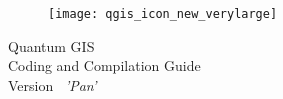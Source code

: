 
\begin{titlepage}
\begin{center}

\begin{figure}[H]
\begin{center}
\texttt{[image: qgis\_icon\_new\_verylarge]} 
\end{center}
\end{figure}

\Huge{Quantum GIS}\\
\vspace{0.5cm}
\Large{Coding and Compilation Guide} \\
\vspace{0.5cm}
\Large{Version ~\CURRENT \textsl{'Pan'}}

\end{center}
\end{titlepage}

